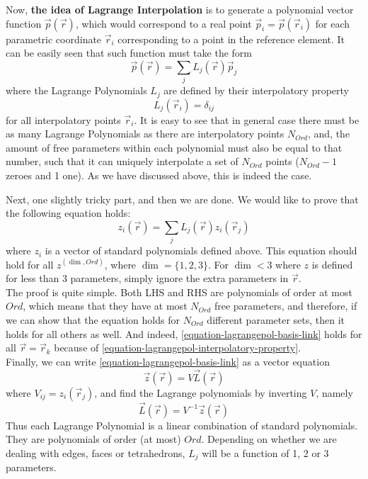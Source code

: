 \noindent
Now, \textbf{the idea of Lagrange Interpolation} is to generate a polynomial vector function $\vec{p}(\vec{r})$, which would correspond to a real point $\vec{p}_i = \vec{p}(\vec{r}_i)$ for each parametric coordinate $\vec{r}_i$ corresponding to a point in the reference element. It can be easily seen that such function must take the form
\begin{equation}
	\vec{p}(\vec{r}) = \sum_j L_j(\vec{r})\vec{p}_j 
\end{equation}
\noindent
where the Lagrange Polynomials $L_j$ are defined by their interpolatory property
\begin{equation}
	\label{equation-lagrangepol-interpolatory-property}
	L_j(\vec{r}_i) = \delta_{ij}
\end{equation}
\noindent
for all interpolatory points $\vec{r}_i$. It is easy to see that in general case there must be as many Lagrange Polynomials as there are interpolatory points $N_{Ord}$, and, the amount of free parameters within each polynomial must also be equal to that number, such that it can uniquely interpolate a set of $N_{Ord}$ points ($N_{Ord} - 1$ zeroes and 1 one). As we have discussed above, this is indeed the case.

\noindent
Next, one slightly tricky part, and then we are done. We would like to prove that the following equation holds:
\begin{equation}
	\label{equation-lagrangepol-basis-link}
	z_i(\vec{r}) = \sum_j L_j(\vec{r}) z_i (\vec{r}_j) 
\end{equation}
\noindent
where $z_i$ is a vector of standard polynomials defined above. This equation should hold for all $z^{(\dim, Ord)}$, where $\dim = \{1,2,3\}$. For $\dim < 3$ where $z$ is defined for less than 3 parameters, simply ignore the extra parameters in $\vec{r}$. \\

\noindent
The proof is quite simple. Both LHS and RHS are polynomials of order at most $Ord$, which means that they have at most $N_{Ord}$ free parameters, and therefore, if we can show that the equation holds for $N_{Ord}$ different parameter sets, then it holds for all others as well. And indeed, \eqref{equation-lagrangepol-basis-link} holds for all $\vec{r} = \vec{r}_k$ because of \eqref{equation-lagrangepol-interpolatory-property}. \\

\noindent
Finally, we can write \eqref{equation-lagrangepol-basis-link} as a vector equation
\begin{equation}
	\vec{z} (\vec{r}) = V \vec{L} (\vec{r})
\end{equation}
\noindent
where $V_{ij} = z_i (\vec{r}_j)$, and find the Lagrange polynomials by inverting $V$, namely
\begin{equation}
	\vec{L} (\vec{r}) = V^{-1} \vec{z} (\vec{r})
\end{equation}
\noindent
Thus each Lagrange Polynomial is a linear combination of standard polynomials. They are polynomials of order (at most) $Ord$. Depending on whether we are dealing with edges, faces or tetrahedrons, $L_j$ will be a function of 1, 2 or 3 parameters.

